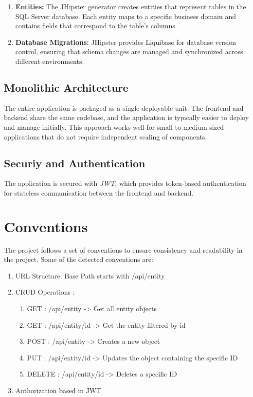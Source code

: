 \documentclass[a4paper,11pt,openright,BCOR=15mm]{scrbook}
\begin{document}
		\begin{enumerate}
			\item \textbf{Entities:} The JHipster generator creates entities that represent tables in the SQL Server database. Each entity maps to a specific business domain and contains fields that correspond to the table’s columns.
			\item \textbf{Database Migrations:} JHipster provides Liquibase for database version control, ensuring that schema changes are managed and synchronized across different environments.
		\end{enumerate}
		
		\subsection{Monolithic Architecture}
		The entire application is packaged as a single deployable unit. The frontend and backend share the same codebase, and the application is typically easier to deploy and manage initially. This approach works well for small to medium-sized applications that do not require independent scaling of components.
		
		\subsection{Securiy and Authentication}
		The application is secured with \textit{JWT}, which provides token-based authentication for stateless communication between the frontend and backend.
		
		\section{Conventions}
		
		The project follows a set of conventions to ensure consistency and readability in the
		project. Some of the detected conventions are:
		
		\begin{enumerate}
			\item URL Structure: Base Path starts with /api/{entity}
			\item CRUD Operations :
			\begin{enumerate}
				\item GET : /api/{entity} -> Get all entity objects
				\item GET : /api/{entity}/{id} -> Get the entity filtered by id
				\item POST : /api/{entity} -> Creates a new object
				\item PUT : /api/{entity}/{id} -> Updates the object containing the specific ID
				\item DELETE : /api/{entity}/{id} -> Deletes a specific ID
			\end{enumerate}
			\item Authorization based in JWT
		\end{enumerate}
	
\end{document}
